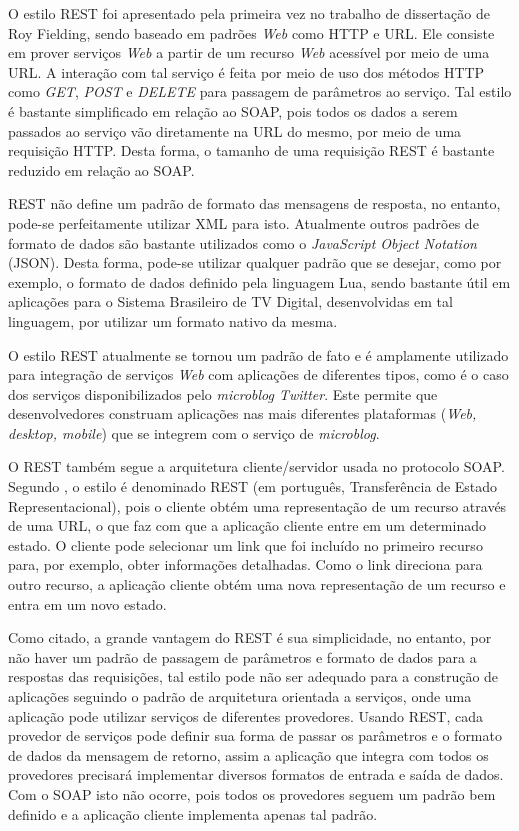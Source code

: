 O estilo REST foi apresentado pela primeira vez no trabalho de dissertação de Roy Fielding\cite{fielding2000architectural},
sendo baseado em padrões \textit{Web} como HTTP e URL. Ele consiste em prover serviços \textit{Web}
a partir de um recurso \textit{Web} acessível por meio de uma URL. 
A interação com tal serviço é feita por meio de uso dos métodos HTTP como \textit{GET}, \textit{POST} e \textit{DELETE} para passagem de parâmetros ao serviço.
Tal estilo é bastante simplificado em relação ao SOAP, pois todos os dados a serem passados ao serviço
vão diretamente na URL do mesmo, por meio de uma requisição HTTP. Desta forma, o tamanho de uma requisição REST
é bastante reduzido em relação ao SOAP.

REST não define um padrão de formato das mensagens de resposta, no entanto, pode-se perfeitamente utilizar
XML para isto. Atualmente outros padrões de formato de dados são bastante utilizados como o \textit{JavaScript Object Notation} (JSON). Desta forma, pode-se utilizar qualquer padrão que se desejar, como por exemplo,
o formato de dados definido pela linguagem Lua, sendo bastante útil em aplicações para o Sistema Brasileiro de TV Digital, desenvolvidas em tal  linguagem, por utilizar um formato nativo da mesma.

O estilo REST atualmente se tornou um padrão de fato e é amplamente utilizado para integração
de serviços \textit{Web} com aplicações de diferentes tipos, como é o caso dos serviços disponibilizados
pelo \textit{microblog Twitter}. Este permite que desenvolvedores construam aplicações 
nas mais diferentes plataformas (\textit{Web, desktop, mobile}) que se integrem
com o serviço de \textit{microblog}.

O REST também segue a arquitetura cliente/servidor usada no protocolo SOAP. 
Segundo \cite{welling2006integration}, o estilo é denominado REST (em português, Transferência de Estado Representacional), pois o cliente obtém
uma representação de um recurso através de uma URL, o que faz com que a aplicação cliente
entre em um determinado estado. O cliente pode selecionar um link que foi incluído no primeiro recurso para,
por exemplo, obter informações detalhadas. Como o link direciona para outro recurso, a aplicação cliente
obtém uma nova representação de um recurso e entra em um novo estado.

Como citado, a grande vantagem do REST é sua simplicidade, no entanto, 
por não haver um padrão de passagem de parâmetros e formato de dados
para a respostas das requisições, tal estilo pode não ser adequado para 
a construção de aplicações seguindo o padrão de arquitetura orientada
a serviços, onde uma aplicação pode utilizar serviços de diferentes provedores.
Usando REST, cada provedor de serviços pode definir sua forma de passar os parâmetros
e o formato de dados da mensagem de retorno, assim a aplicação que integra com todos
os provedores precisará implementar diversos formatos de entrada e saída de dados.
Com o SOAP isto não ocorre, pois todos os provedores seguem um padrão bem definido
e a aplicação cliente implementa apenas tal padrão.

